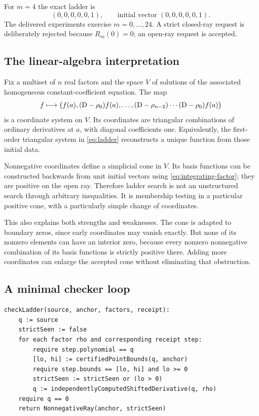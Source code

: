 For $m=4$ the exact ladder is
\[
 (0,0,0,0,0,1),\qquad\text{initial vector }(0,0,0,0,0,1).
\]
The delivered experiments exercise $m=0,\ldots,24$. A strict closed-ray request
is deliberately rejected because $R_m(0)=0$; an open-ray request is accepted.

\subsection{The linear-algebra interpretation}

Fix a multiset of $n$ real factors and the space $V$ of solutions of the
associated homogeneous constant-coefficient equation. The map
\[
 f\longmapsto
 \bigl(f(a), (\mathrm D-\rho_0)f(a),\ldots,
       (\mathrm D-\rho_{n-2})\cdots(\mathrm D-\rho_0)f(a)\bigr)
\]
is a coordinate system on $V$. Its coordinates are triangular combinations of
ordinary derivatives at $a$, with diagonal coefficients one. Equivalently,
the first-order triangular system in \eqref{eq:ladder} reconstructs a unique
function from those initial data.

Nonnegative coordinates define a simplicial cone in $V$. Its basis functions
can be constructed backwards from unit initial vectors using
\eqref{eq:integrating-factor}; they are positive on the open ray. Therefore
ladder search is not an unstructured search through arbitrary inequalities.
It is membership testing in a particular positive cone, with a particularly
simple change of coordinates.

This also explains both strengths and weaknesses. The cone is adapted to
boundary zeros, since early coordinates may vanish exactly. But none of its
nonzero elements can have an interior zero, because every nonzero nonnegative
combination of its basis functions is strictly positive there. Adding more
coordinates can enlarge the accepted cone without eliminating that obstruction.

\subsection{A minimal checker loop}

\par\noindent\begin{minipage}{\linewidth}
\begin{lstlisting}
checkLadder(source, anchor, factors, receipt):
    q := source
    strictSeen := false
    for each factor rho and corresponding receipt step:
        require step.polynomial == q
        [lo, hi] := certifiedPointBounds(q, anchor)
        require step.bounds == [lo, hi] and lo >= 0
        strictSeen := strictSeen or (lo > 0)
        q := independentlyComputedShiftedDerivative(q, rho)
    require q == 0
    return NonnegativeRay(anchor, strictSeen)
\end{lstlisting}
\end{minipage}\par

